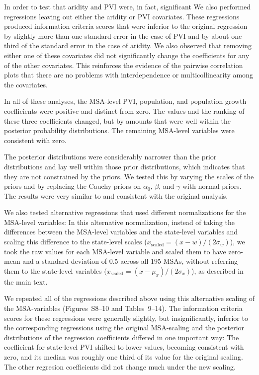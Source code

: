 \documentclass[draft]{agujournal}\usepackage{knitr}
\begin{document}
In order to test that aridity and PVI were, in fact, significant We also performed
regressions leaving out either the aridity or PVI covariates.
These regressions produced information criteria scores that were inferior to the
original regression by slightly more than one standard error in the case of PVI
and by about one-third of the standard error in the case of aridity.
We also observed that removing either one of these covariates did not significantly
change the coefficients for any of the other covariates. This reinforces the evidence
of the pairwise correlation plots that there are no problems with
interdependence or multicollinearity among the covariates.

In all of these analyses, the MSA-level PVI, population, and population
growth coefficients were positive and distinct from zero. The values and the
ranking of these three coefficients changed, but by amounts that were well
within the posterior probability distributions. The remaining MSA-level
variables were consistent with zero.

The posterior distributions were considerably narrower than the prior
distributions and lay well within those prior distributions,
which indicates that they are not constrained by the priors.
We tested this by varying the scales of the priors and by
replacing the Cauchy priors on $\alpha_0$, $\beta$, and $\gamma$ with normal
priors.
The results were very similar to and consistent with the original analysis.

We also tested alternative regressions that used different normalizations for the
MSA-level variables: In this alternative normalization, instead of taking the
differences between the MSA-level variables and the state-level variables and
scaling this difference to the state-level scales
($x_{\text{scaled}} = (x - w) / (2 \sigma_w)$),
we took the raw values for
each MSA-level variable and scaled them to have zero-mean and a standard deviation
of 0.5 across all 195 MSAs, without referring them to the state-level variables
($x_{\text{scaled}} = (x - \mu_x) / (2 \sigma_x)$), as described in the main text.

We repeated all of the regressions described above using this alternative scaling
of the MSA-variables (Figures~S8--10 and Tables~9--14).
The information criteria scores for these regressions were generally slightly,
but insignificantly, inferior to the corresponding regressions using the original
MSA-scaling and the posterior distributions of the regression coefficients
differed in one important way: The coefficient for state-level PVI shifted to
lower values, becoming consistent with zero, and its
median was roughly one third of its value for the original scaling.
The other regresion coefficients did not change much under the new scaling.
\end{document}
